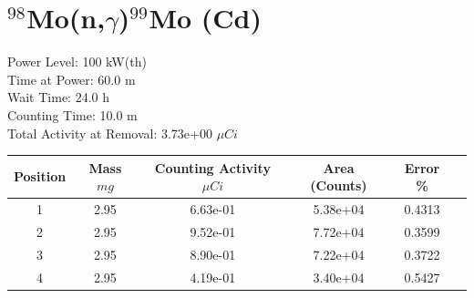 \newpage

\section*{ $^{98}$Mo(n,$\gamma$)$^{99}$Mo (Cd) }

Power Level: 100 kW(th) \\
Time at Power: 60.0 m \\
Wait Time: 24.0 h \\
Counting Time: 10.0 m \\
Total Activity at Removal: 3.73e+00 $\mu Ci$

\begin{table}[h]
\centering
\begin{tabular}{ |c|c|c|c|c|c| }
 \hline
 Position & Mass $mg$ & Counting Activity $\mu Ci$ & Area (Counts) & Error \% \\
 \hline 
 1 & 2.95 & 6.63e-01 & 5.38e+04 & 0.4313 \\ 
\hline
 2 & 2.95 & 9.52e-01 & 7.72e+04 & 0.3599 \\ 
\hline
 3 & 2.95 & 8.90e-01 & 7.22e+04 & 0.3722 \\ 
\hline
 4 & 2.95 & 4.19e-01 & 3.40e+04 & 0.5427 \\ 
\hline
\end{tabular}
\end{table}

